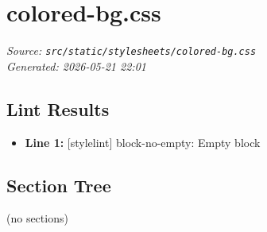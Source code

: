 
\section{colored-bg.css}
\textit{Source: \texttt{src/static/stylesheets/colored-bg.css}} \\
\textit{Generated: 2026-05-21 22:01} \\

\subsection{Lint Results}
\begin{itemize}
  \item \textbf{Line 1:} [stylelint] block-no-empty: Empty block
\end{itemize}

\subsection{Section Tree}
\begingroup
\linespread{0.9}\selectfont
\begin{verbnobox}[\FiraCode]
  (no sections)
\end{verbnobox}
\endgroup

